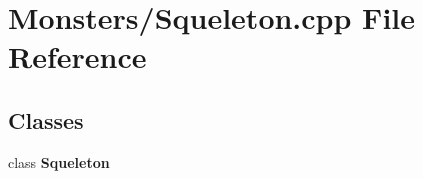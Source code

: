 \section{Monsters/\-Squeleton.cpp File Reference}
\label{_squeleton_8cpp}
\subsection*{Classes}
\begin{DoxyCompactItemize}
\item 
class {\bf Squeleton}
\end{DoxyCompactItemize}
